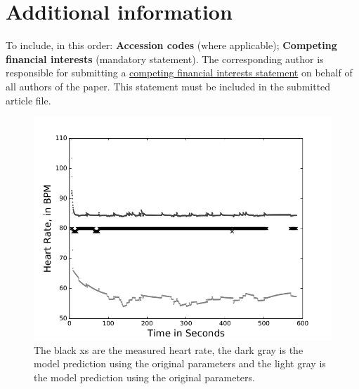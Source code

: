 \documentclass[fleqn,10pt]{wlscirep}
\begin{document}
\section*{Additional information}
To include, in this order: \textbf{Accession codes} (where applicable); \textbf{Competing financial interests} (mandatory statement). 
The corresponding author is responsible for submitting a \href{http://www.nature.com/srep/policies/index.html#competing}{competing financial interests statement} on behalf of all authors of the paper. This statement must be included in the submitted article file.


\begin{figure}[ht]
                \centering
        \includegraphics[width=\linewidth]{figures/s27193-3271-03-15-13-26n}
       \caption{The black xs are the measured heart rate, the dark gray is the model prediction using the original parameters and the light gray is the model prediction using the original parameters.}
       \label{fig:paramscomparsionNLopt}
\end{figure}
\end{document}
